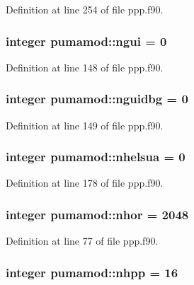 \-Definition at line 254 of file ppp.\-f90.

\hypertarget{classpumamod_a32948de893d3d7aff01b6372d649f0f6}{
\subsubsection[{ngui}]{\setlength{\rightskip}{0pt plus 5cm}integer {\bf pumamod\-::ngui} = 0}}
\label{classpumamod_a32948de893d3d7aff01b6372d649f0f6}


\-Definition at line 148 of file ppp.\-f90.

\hypertarget{classpumamod_a87bc07500cf139d8845b380e0dfbe14f}{
\subsubsection[{nguidbg}]{\setlength{\rightskip}{0pt plus 5cm}integer {\bf pumamod\-::nguidbg} = 0}}
\label{classpumamod_a87bc07500cf139d8845b380e0dfbe14f}


\-Definition at line 149 of file ppp.\-f90.

\hypertarget{classpumamod_a0f47e459576ce1b123298a6c3dd7d91b}{
\subsubsection[{nhelsua}]{\setlength{\rightskip}{0pt plus 5cm}integer {\bf pumamod\-::nhelsua} = 0}}
\label{classpumamod_a0f47e459576ce1b123298a6c3dd7d91b}


\-Definition at line 178 of file ppp.\-f90.

\hypertarget{classpumamod_a8bbbf57ba00e0a60edcb5f55b6c4881f}{
\subsubsection[{nhor}]{\setlength{\rightskip}{0pt plus 5cm}integer {\bf pumamod\-::nhor} = 2048}}
\label{classpumamod_a8bbbf57ba00e0a60edcb5f55b6c4881f}


\-Definition at line 77 of file ppp.\-f90.

\hypertarget{classpumamod_a5ac284ed19ba1f7367a214afe2193c1e}{
\subsubsection[{nhpp}]{\setlength{\rightskip}{0pt plus 5cm}integer {\bf pumamod\-::nhpp} = 16}}
\label{classpumamod_a5ac284ed19ba1f7367a214afe2193c1e}


